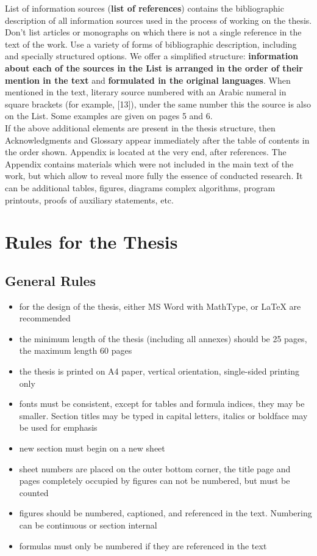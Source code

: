 \documentclass[a4paper, 12pt]{article}
\begin{document}
List of information sources (\textbf{list of references}) contains the bibliographic
description of all information sources used in the process of working on the 
thesis. Don't list articles or monographs on which there is not a single 
reference in the text of the work. Use a variety of forms of bibliographic 
description, including and specially structured options. We offer a simplified
structure: \textbf{information about each of the sources in the List is arranged in 
the order of their mention in the text} and \textbf{formulated in the original 
languages}. When mentioned in the text, literary source numbered with an
Arabic numeral in square brackets (for example, [13]), under the same 
number this the source is also on the List. Some examples are given on pages 
5 and 6.\\

If the above additional elements are present in the thesis structure, then
Acknowledgments and Glossary appear immediately after the table of contents 
in the order shown. Appendix is located at the very end, after references. The 
Appendix contains materials which were not included in the main text of the 
work, but which allow to reveal more fully the essence of conducted research. 
It can be additional tables, figures, diagrams complex algorithms, program 
printouts, proofs of auxiliary statements, etc.\\

\section*{Rules for the Thesis}

\subsection*{General Rules}

\begin{itemize}
    \item for the design of the thesis, either MS Word with MathType, or
        \LaTeX{} are recommended
    \item the minimum length of the thesis (including all annexes) should be 25 
        pages, the maximum length 60 pages
    \item the thesis is printed on A4 paper, vertical orientation, single-sided
        printing only
    \item fonts must be consistent, except for tables and formula indices, they 
        may be smaller. Section titles may be typed in capital letters, italics 
        or boldface may be used for emphasis
    \item new section must begin on a new sheet
    \item sheet numbers are placed on the outer bottom corner, the title page 
        and pages completely occupied by figures can not be numbered, but must 
        be counted
    \item figures should be numbered, captioned, and referenced in the text. 
        Numbering can be continuous or section internal
    \item formulas must only be numbered if they are referenced in the text
\end{itemize}
\end{document}
